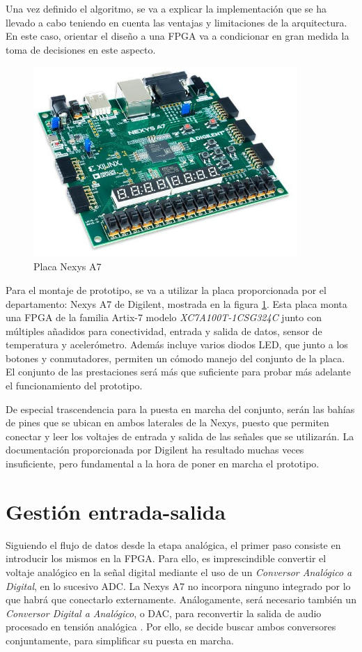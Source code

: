 Una vez definido el algoritmo, se va a explicar la implementación que se ha llevado a cabo teniendo en cuenta las ventajas y limitaciones de la arquitectura. En este caso, orientar el diseño a una FPGA va a condicionar en gran medida la toma de decisiones en este aspecto. 

\begin{figure}[!ht]
\begin{center}
\includegraphics[width=10cm]{img/nexysa7.jpg}
\caption{\label{fig:nexys}Placa Nexys A7}
\end{center}
\end{figure}

Para el montaje de prototipo, se va a utilizar la placa proporcionada por el departamento: Nexys A7 de Digilent, mostrada en la figura \ref{fig:nexys}. Esta placa monta una FPGA de la familia Artix-7 modelo \emph{XC7A100T-1CSG324C} junto con múltiples añadidos para conectividad, entrada y salida de datos, sensor de temperatura y acelerómetro. Además incluye varios diodos LED, que junto a los botones y conmutadores, permiten un cómodo manejo del conjunto de la placa. El conjunto de las prestaciones será más que suficiente para probar más adelante el funcionamiento del prototipo.

De especial trascendencia para la puesta en marcha del conjunto, serán las bahías de pines que se ubican en ambos laterales de la Nexys, puesto que permiten conectar y leer los voltajes de entrada y salida de las señales que se utilizarán. La documentación proporcionada por Digilent \cite{Nexys} ha resultado muchas veces insuficiente, pero fundamental a la hora de poner en marcha el prototipo.

\section{Gestión entrada-salida}
Siguiendo el flujo de datos desde la etapa analógica, el primer paso consiste en introducir los mismos en la FPGA. Para ello, es imprescindible convertir el voltaje analógico en la señal digital mediante el uso de un \emph{Conversor Analógico a Digital}, en lo sucesivo ADC. La Nexys A7 no incorpora ninguno integrado por lo que habrá que conectarlo externamente. Análogamente, será necesario también un \emph{Conversor Digital a Analógico}, o DAC, para reconvertir la salida de audio procesado en tensión analógica . Por ello, se decide buscar ambos conversores conjuntamente, para simplificar su puesta en marcha.

